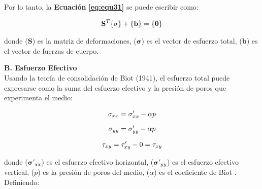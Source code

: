 Por lo tanto, la \textbf{Ecuación} \textbf{\ref{eq:equ31}} se puede escribir como:

\begin{ceqn} 
\begin{gather} \label{eq:equ33} 
\normalsize{\mathbf{S}^T\{\mathbf{\sigma}\}+\{\mathbf{b}\}=\{\mathbf{0}\}}
\end{gather}  
\end{ceqn}
donde ($\mathbf{S}$) es la matriz de deformaciones, ($\mathbf{\sigma}$) es el vector de esfuerzo total, ($\mathbf{b}$) es el vector de fuerzas de cuerpo.\vspace{1cm}


\textbf{B. Esfuerzo Efectivo}
\\
Usando la teoría de consolidación de Biot (1941)\cite{Biot1941GeneralConsolidation}, el esfuerzo total puede expresarse como la suma del esfuerzo efectivo y la presión de poros que experimenta el medio:

\begin{ceqn} 
\begin{subequations} \label{eq:equ34} 
\begin{gather}
\normalsize{\sigma_{xx} = \sigma'_{xx} - \alpha p} \label{eq:equ34a} \\[6pt]
\normalsize{\sigma_{yy} = \sigma'_{yy} - \alpha p} \label{eq:equ34b} \\[6pt]
\normalsize{\tau_{xy} = \tau'_{xy} - 0 = \tau_{xy}} \label{eq:equ34c}
\end{gather}  
\end{subequations} 
\end{ceqn}
donde ($\mathbf{\sigma'_{xx}}$) es el esfuerzo efectivo horizontal,  ($\mathbf{\sigma'_{yy}}$) es el esfuerzo efectivo vertical, ($p$) es la presión de poros del medio, ($\alpha$) es el coeficiente de Biot \cite{Biot1941GeneralConsolidation}. Definiendo:

